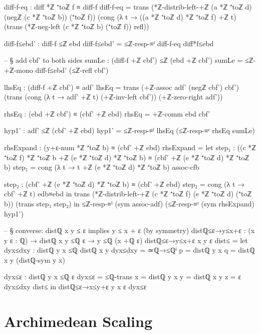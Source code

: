 \documentclass[11pt,a4paper]{book}
\begin{document}
\begin{code}
    diff-f-eq : diff *ℤ ⁺toℤ f ≡ diff-f
    diff-f-eq =
      trans
        (*ℤ-distrib-left-+ℤ (a *ℤ ⁺toℤ d) (negℤ (c *ℤ ⁺toℤ b)) (⁺toℤ f))
        (cong
          (λ t → ((a *ℤ ⁺toℤ d) *ℤ ⁺toℤ f) +ℤ t)
          (trans
            (*ℤ-neg-left (c *ℤ ⁺toℤ b) (⁺toℤ f))
            refl))

    diff-f≤ebd' : diff-f ≤ℤ ebd
    diff-f≤ebd' = ≤ℤ-resp-≡ˡ diff-f-eq diff*f≤ebd

    -- § add cbf' to both sides
    sumLe : (diff-f +ℤ cbf') ≤ℤ (ebd +ℤ cbf')
    sumLe = ≤ℤ-+ℤ-mono diff-f≤ebd' (≤ℤ-refl cbf')

    lhsEq : (diff-f +ℤ cbf') ≡ adf'
    lhsEq =
      trans
        (+ℤ-assoc adf' (negℤ cbf') cbf')
        (trans
          (cong (λ t → adf' +ℤ t) (+ℤ-inv-left cbf'))
          (+ℤ-zero-right adf'))

    rhsEq : (ebd +ℤ cbf') ≡ (cbf' +ℤ ebd)
    rhsEq = +ℤ-comm ebd cbf'

    hyp1' : adf' ≤ℤ (cbf' +ℤ ebd)
    hyp1' = ≤ℤ-resp-≡ˡ lhsEq (≤ℤ-resp-≡ʳ rhsEq sumLe)

    rhsExpand : (y+ε-num *ℤ ⁺toℤ b) ≡ (cbf' +ℤ ebd)
    rhsExpand =
      let
        step₁ : ((c *ℤ ⁺toℤ f) *ℤ ⁺toℤ b +ℤ (e *ℤ ⁺toℤ d) *ℤ ⁺toℤ b) ≡ (cbf' +ℤ (e *ℤ ⁺toℤ d) *ℤ ⁺toℤ b)
        step₁ = cong (λ t → t +ℤ (e *ℤ ⁺toℤ d) *ℤ ⁺toℤ b) assoc-cfb

        step₂ : (cbf' +ℤ (e *ℤ ⁺toℤ d) *ℤ ⁺toℤ b) ≡ (cbf' +ℤ ebd)
        step₂ = cong (λ t → cbf' +ℤ t) edb≡ebd
      in
      trans (*ℤ-distrib-left-+ℤ (c *ℤ ⁺toℤ f) (e *ℤ ⁺toℤ d) (⁺toℤ b)) (trans step₁ step₂)
  in
  ≤ℤ-resp-≡ˡ (sym assoc-adf) (≤ℤ-resp-≡ʳ (sym rhsExpand) hyp1')

-- § converse: distℚ x y ≤ ε implies y ≤ x + ε (by symmetry)
distℚ≤ε→y≤x+ε : (x y ε : ℚ) → distℚ x y ≤ℚ ε → y ≤ℚ (x +ℚ ε)
distℚ≤ε→y≤x+ε x y ε dist≤ =
  let
    dyx≤dxy : distℚ y x ≤ℚ distℚ x y
    dyx≤dxy =
      ≃ℚ→≤ℚˡ
        {p = distℚ y x}
        {q = distℚ x y}
        (distℚ-sym y x)

    dyx≤ε : distℚ y x ≤ℚ ε
    dyx≤ε =
      ≤ℚ-trans
        {x = distℚ y x}
        {y = distℚ x y}
        {z = ε}
        dyx≤dxy
        dist≤
  in
  distℚ≤ε→x≤y+ε y x ε dyx≤ε
\end{code}


\chapter{Archimedean Scaling}
\label{ch:archimedean}
\end{document}
